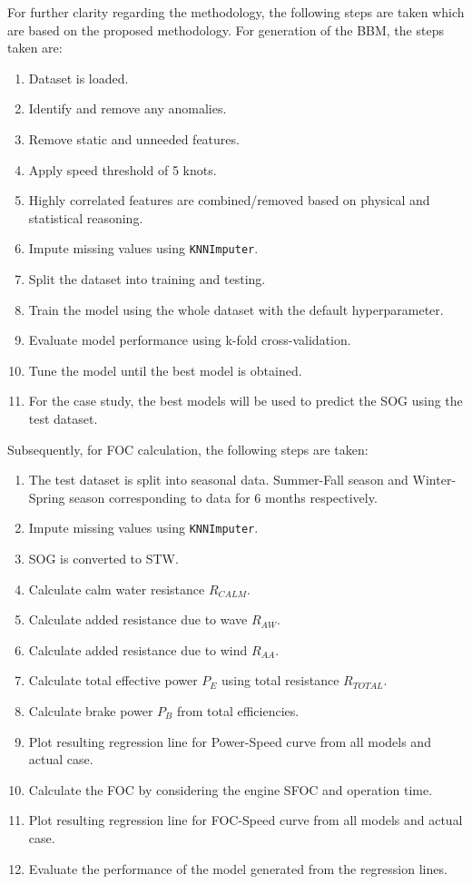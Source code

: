 \documentclass[]{interact}
\theoremstyle{plain}%
\theoremstyle{definition}
\theoremstyle{remark}
\begin{document}
For further clarity regarding the methodology, the following steps are taken which are based on the proposed methodology. For generation of the BBM, the steps taken are: 

\begin{enumerate}
    \item Dataset is loaded.
    \item Identify and remove any anomalies.
    \item Remove static and unneeded features.
    \item Apply speed threshold of 5 knots.
    \item Highly correlated features are combined/removed based on physical and statistical reasoning.
    \item Impute missing values using {\tt KNNImputer}.
    \item Split the dataset into training and testing.
    \item Train the model using the whole dataset with the default hyperparameter.
    \item Evaluate model performance using k-fold cross-validation.
    \item Tune the model until the best model is obtained.
    \item For the case study, the best models will be used to predict the SOG using the test dataset.
\end{enumerate}

Subsequently, for FOC calculation, the following steps are taken:

\begin{enumerate}
    \item The test dataset is split into seasonal data. Summer-Fall season and Winter-Spring season corresponding to data for 6 months respectively.
    \item Impute missing values using {\tt KNNImputer}.
    \item SOG is converted to STW.
    \item Calculate calm water resistance $R_{CALM}$.
    \item Calculate added resistance due to wave $R_{AW}$.
    \item Calculate added resistance due to wind $R_{AA}$.
    \item Calculate total effective power $P_E$ using total resistance $R_{TOTAL}$.
    \item Calculate brake power $P_B$ from total efficiencies.
    \item Plot resulting regression line for Power-Speed curve from all models and actual case. 
    \item Calculate the FOC by considering the engine SFOC and operation time.
    \item Plot resulting regression line for FOC-Speed curve from all models and actual case.
    \item Evaluate the performance of the model generated from the regression lines.
\end{enumerate}
\end{document}
